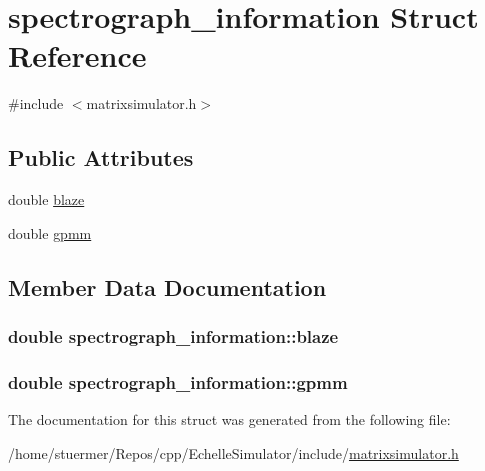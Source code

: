 \hypertarget{structspectrograph__information}{}\section{spectrograph\+\_\+information Struct Reference}
\label{structspectrograph__information}


{\ttfamily \#include $<$matrixsimulator.\+h$>$}

\subsection*{Public Attributes}
\begin{DoxyCompactItemize}
\item 
double \hyperlink{structspectrograph__information_addf9c0eb09013fe861c45f0544e3a83c}{blaze}
\item 
double \hyperlink{structspectrograph__information_a698a49f2f4644c3142d457e18c3acd3d}{gpmm}
\end{DoxyCompactItemize}


\subsection{Member Data Documentation}
\subsubsection[{\texorpdfstring{blaze}{blaze}}]{\setlength{\rightskip}{0pt plus 5cm}double spectrograph\+\_\+information\+::blaze}\hypertarget{structspectrograph__information_addf9c0eb09013fe861c45f0544e3a83c}{}\label{structspectrograph__information_addf9c0eb09013fe861c45f0544e3a83c}
\subsubsection[{\texorpdfstring{gpmm}{gpmm}}]{\setlength{\rightskip}{0pt plus 5cm}double spectrograph\+\_\+information\+::gpmm}\hypertarget{structspectrograph__information_a698a49f2f4644c3142d457e18c3acd3d}{}\label{structspectrograph__information_a698a49f2f4644c3142d457e18c3acd3d}


The documentation for this struct was generated from the following file\+:\begin{DoxyCompactItemize}
\item 
/home/stuermer/\+Repos/cpp/\+Echelle\+Simulator/include/\hyperlink{matrixsimulator_8h}{matrixsimulator.\+h}\end{DoxyCompactItemize}
